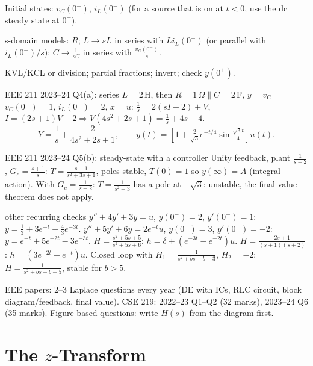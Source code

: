 \begin{method}[Circuits]
\begin{steps}
\item Initial states: $v_C(0^-)$, $i_L(0^-)$ (for a source that is on at $t<0$, use the dc steady state at $0^-$).
\item s-domain models: $R$; $L\to sL$ in series with $Li_L(0^-)$ (or parallel with $i_L(0^-)/s$); $C\to\frac1{sC}$ in series with $\frac{v_C(0^-)}s$.
\item KVL/KCL or division; partial fractions; invert; check $y(0^+)$.
\end{steps}
\end{method}
\begin{example}{EEE 211 2023--24 Q4(a): series $L=2$\,H, then $R=1\,\Omega\parallel C=2$\,F, $y=v_C$}
$v_C(0^-)=1$, $i_L(0^-)=2$, $x=u$: $\frac1s=2(sI-2)+V$, $I=(2s+1)V-2\Rightarrow V(4s^2+2s+1)=\frac1s+4s+4$.
\[Y=\frac1s+\frac2{4s^2+2s+1},\qquad y(t)=\left[1+\tfrac2{\sqrt3}e^{-t/4}\sin\tfrac{\sqrt3t}4\right]u(t).\]
\end{example}
\begin{example}{EEE 211 2023--24 Q5(b): steady-state with a controller}
Unity feedback, plant $\frac1{s+2}$, $G_c=\frac{s+1}s$: $T=\frac{s+1}{s^2+3s+1}$, poles stable, $T(0)=1$ so $y(\infty)=A$ (integral action). With $G_c=\frac1{s-2}$: $T=\frac1{s^2-3}$ has a pole at $+\sqrt3$: unstable, the final-value theorem does not apply.
\end{example}
\begin{example}{other recurring checks}
$y''+4y'+3y=u$, $y(0^-)=2$, $y'(0^-)=1$: $y=\tfrac13+3e^{-t}-\tfrac43e^{-3t}$. $y''+5y'+6y=2e^{-t}u$, $y(0^-)=3$, $y'(0^-)=-2$: $y=e^{-t}+5e^{-2t}-3e^{-3t}$. $H=\frac{s^2+5s+5}{s^2+5s+6}$: $h=\delta+(e^{-3t}-e^{-2t})u$. $H=\frac{2s+1}{(s+1)(s+2)}$: $h=(3e^{-2t}-e^{-t})u$. Closed loop with $H_1=\frac1{s^2+bs+b-3}$, $H_2=-2$: $H=\frac1{s^2+bs+b-5}$, stable for $b>5$.
\end{example}
\begin{inexam}
EEE papers: 2--3 Laplace questions every year (DE with ICs, RLC circuit, block diagram/feedback, final value). CSE 219: 2022--23 Q1--Q2 (32 marks), 2023--24 Q6 (35 marks). Figure-based questions: write $H(s)$ from the diagram first.
\end{inexam}

\chapter{The $z$-Transform}

